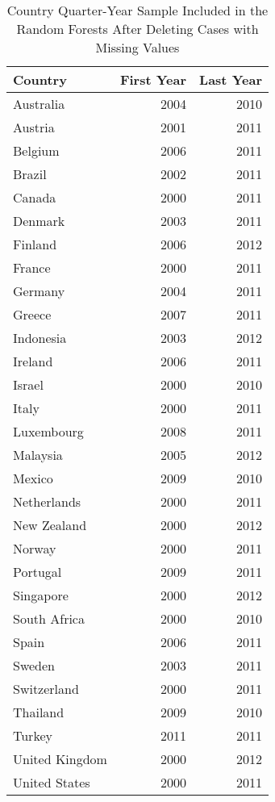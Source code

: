 \begin{table}[ht]
\centering
\caption{Country Quarter-Year Sample Included in the Random Forests After Deleting Cases with Missing Values} 
\label{sampcases}
\begin{tabular}{lrr}
  \hline
Country & First Year & Last Year \\ 
  \hline
Australia & 2004 & 2010 \\ 
  Austria & 2001 & 2011 \\ 
  Belgium & 2006 & 2011 \\ 
  Brazil & 2002 & 2011 \\ 
  Canada & 2000 & 2011 \\ 
  Denmark & 2003 & 2011 \\ 
  Finland & 2006 & 2012 \\ 
  France & 2000 & 2011 \\ 
  Germany & 2004 & 2011 \\ 
  Greece & 2007 & 2011 \\ 
  Indonesia & 2003 & 2012 \\ 
  Ireland & 2006 & 2011 \\ 
  Israel & 2000 & 2010 \\ 
  Italy & 2000 & 2011 \\ 
  Luxembourg & 2008 & 2011 \\ 
  Malaysia & 2005 & 2012 \\ 
  Mexico & 2009 & 2010 \\ 
  Netherlands & 2000 & 2011 \\ 
  New Zealand & 2000 & 2012 \\ 
  Norway & 2000 & 2011 \\ 
  Portugal & 2009 & 2011 \\ 
  Singapore & 2000 & 2012 \\ 
  South Africa & 2000 & 2010 \\ 
  Spain & 2006 & 2011 \\ 
  Sweden & 2003 & 2011 \\ 
  Switzerland & 2000 & 2011 \\ 
  Thailand & 2009 & 2010 \\ 
  Turkey & 2011 & 2011 \\ 
  United Kingdom & 2000 & 2012 \\ 
  United States & 2000 & 2011 \\ 
   \hline
\end{tabular}
\end{table}

